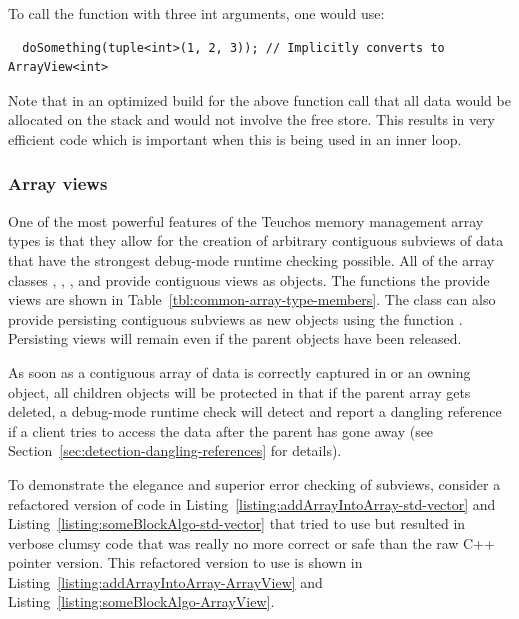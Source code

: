 \documentclass[pdf,ps2pdf,11pt]{SANDreport}
\begin{document}
To call the function with three int arguments, one would use:

{\small\begin{verbatim}
  doSomething(tuple<int>(1, 2, 3)); // Implicitly converts to ArrayView<int>
\end{verbatim}}

Note that in an optimized build for the above function call that all
data would be allocated on the stack and would not involve the free
store.  This results in very efficient code which is important when
this is being used in an inner loop.


%
{}\subsubsection{Array views}
\label{sec:array-views}
%

One of the most powerful features of the Teuchos memory management
array types is that they allow for the creation of arbitrary
contiguous subviews of data that have the strongest debug-mode runtime
checking possible.  All of the array classes {},
{}, {}, and {} provide contiguous
views as {} objects.  The functions the provide
{} views are shown in
Table~\ref{tbl:common-array-type-members}.  The {} class
can also provide persisting contiguous subviews as new
{} objects using the function
{}.  Persisting views will remain
even if the parent {} objects have been released.

As soon as a contiguous array of data is correctly captured in
{} or an owning {} object, all children
{} objects will be protected in that if the parent
array gets deleted, a debug-mode runtime check will detect and report
a dangling reference if a client tries to access the data after the
parent has gone away (see
Section~\ref{sec:detection-dangling-references} for details).

To demonstrate the elegance and superior error checking of
{} subviews, consider a refactored version of code in
Listing~\ref{listing:addArrayIntoArray-std-vector} and
Listing~\ref{listing:someBlockAlgo-std-vector} that tried to use
{} but resulted in verbose clumsy code that was
really no more correct or safe than the raw C++ pointer version.  This
refactored version to use {} is shown in
Listing~\ref{listing:addArrayIntoArray-ArrayView} and
Listing~\ref{listing:someBlockAlgo-ArrayView}.
\end{document}
